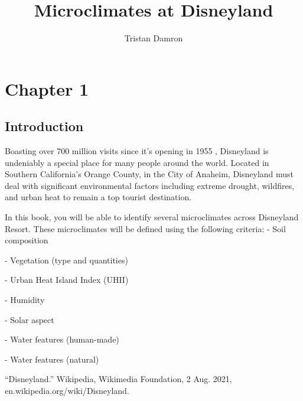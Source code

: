 \documentclass[11pt]{report}
\title{\textbf{Microclimates at Disneyland}}
\author{Tristan Damron}
\date{}
\begin{document}
\chapter{Chapter 1}

\section{Introduction}

Boasting over 700 million visits since it's opening in 1955 \cite{disneyland}, Disneyland is undeniably a special place for many people around the world. Located in Southern California's Orange County, in the City of Anaheim, Disneyland must deal with significant environmental factors including extreme drought, wildfires, and urban heat to remain a top tourist destination.

In this book, you will be able to identify several microclimates across Disneyland Resort. These microclimates will be defined using the following criteria:
- Soil composition

- Vegetation (type and quantities)

- Urban Heat Island Index (UHII)

- Humidity

- Solar aspect
 
- Water features (human-made)

- Water features (natural)
 

\begin{thebibliography}{9}

“Disneyland.” Wikipedia, Wikimedia Foundation, 2 Aug. 2021, en.wikipedia.org/wiki/Disneyland. 
\end{thebibliography}
\end{document}
